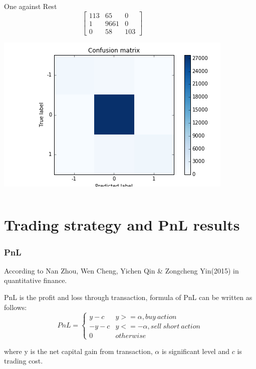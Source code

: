 \documentclass[xcolor={x11names,svgnames,dvipsnames}]{beamer}
\begin{document}
\begin{frame}
\begin{columns}
	\begin{block}{One against Rest}
\begin{equation*}       
\left[           
  \begin{array}{ccc}   
    113&    65 &    0\\  
     1& 9661& 0\\  
    0  & 58 & 103
  \end{array}
\right]               
\end{equation*}
\begin{center}
     \includegraphics[width=1\textwidth, height=0.45\textheight]{one_vs_rest.png}
\end{center}     
\end{block}
\end{columns}

\end{frame}


\section{Trading strategy and PnL results}

\begin{frame}
\frametitle{PnL}
According to Nan Zhou, Wen Cheng, Yichen Qin & Zongcheng Yin(2015) in quantitative finance.

PnL is the profit and loss through transaction, formula of PnL can be written as follows:\\
\begin{equation*}       
PnL=\left\{          
  \begin{array}{ll}   
    y-c  & y>=\alpha, buy\ action   \\  
     -y-c & y<=-\alpha, sell\ short\ action \\
     0 & otherwise
  \end{array}
\right.       
\end{equation*}

where y is the net capital gain from transaction, $\alpha$ is significant level and $c$ is trading cost.
\end{frame}
\end{document}
